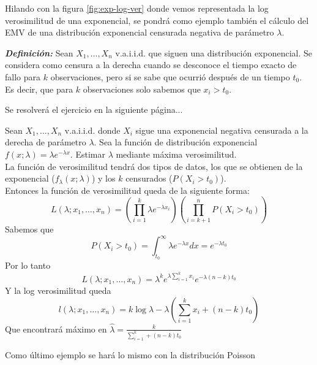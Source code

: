 \vspace{30pt}

Hilando con la figura \ref{fig:exp-log-ver} donde vemos representada la log verosimilitud de una exponencial, se pondrá como ejemplo también el cálculo del EMV de una distribución exponencial censurada negativa de parámetro $\lambda$.

\textbf{\textit{Definición: }} Sean $X_1, \dots, X_n$ v.a.i.i.d. que siguen una distribución exponencial. Se considera como censura a la derecha cuando se desconoce el tiempo exacto de fallo para $k$ observaciones, pero si se sabe que ocurrió después de un tiempo $t_0$. Es decir, que para $k$ observaciones solo sabemos que $x_i > t_0$.

\vspace{30pt}

Se resolverá el ejercicio en la siguiente página...

\newpage

\begin{exercise}
    Sean $X_1, \dots, X_n$ v.a.i.i.d. donde $X_i$ sigue una exponencial negativa censurada a la derecha de parámetro $\lambda$. Sea la función de distribución exponencial $f(x;\lambda)=\lambda e^{-\lambda x}$. Estimar $\lambda$ mediante máxima verosimilitud. \\
    La función de verosimilitud tendrá dos tipos de datos, los que se obtienen de la exponencial ($f_\lambda(x;\lambda)$) y los $k$ censurados ($P(X_i>t_0)$). \\
    Entonces la función de verosimilitud queda de la siguiente forma:
    \[
        L(\lambda; x_1,\dots,x_n)=\left(\prod_{i=1}^{k}\lambda e^{-\lambda x_i}\right)\left(\prod_{i=k+1}^{n}P(X_i>t_0)\right)
    \]
    Sabemos que
    \[
        P(X_i>t_0)=\int_{t_0}^\infty \lambda e^{-\lambda x}dx = e^{-\lambda t_0}
    \]
    Por lo tanto
    \[
        L(\lambda;x_1,\dots,x_n)=\lambda^k e^{\lambda \sum_{i=1}^{k}x_i}e^{-\lambda(n-k)t_0}
    \]
    Y la log verosimilitud queda
    \[
        l(\lambda;x_1,\dots,x_n)=k\log\lambda-\lambda\left(\sum_{i=1}^{k}x_i + (n-k)t_0\right)
    \]
    Que encontrará máximo en $\widehat{\lambda} = \frac{k}{\sum_{i=1}^{k}+(n-k)t_0}$
\end{exercise}

Como último ejemplo se hará lo mismo con la distribución Poisson

